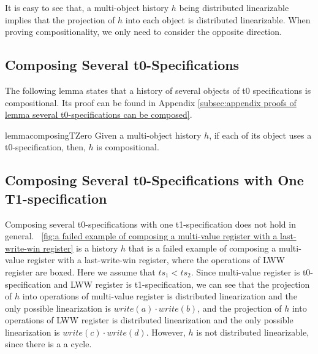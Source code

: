 It is easy to see that, a multi-object history $h$ being distributed linearizable implies that the projection of $h$ into each object is distributed linearizable. When proving compositionality, we only need to consider the opposite direction.




\subsection{Composing Several t0-Specifications}
\label{lemma:several t0-specifications can be composed}

The following lemma states that a history of several objects of t0 specifications is compositional. Its proof can be found in Appendix \ref{subsec:appendix proofs of lemma several t0-specifications can be composed}.

\begin{restatable}{lemma}{composingTZero}
\label{lemma:several t0-specifications can be composed}
Given a multi-object history $h$, if each of its object uses a t0-specification, then, $h$ is compositional.
\end{restatable} 




\subsection{Composing Several t0-Specifications with One T1-specification}
\label{lemma:composing several t0-specification with one t1-specification}

Composing several t0-specifications with one t1-specification does not hold in general. \figurename~\ref{fig:a failed example of composing a multi-value register with a last-write-win register} is a history $h$ that is a failed example of composing a multi-value register with a last-write-win register, where the operations of LWW register are boxed. Here we assume that $\mathit{ts}_1<\mathit{ts}_2$. Since multi-value register is t0-specification and LWW register is t1-specification, we can see that the projection of $h$ into operations of multi-value register is distributed linearization and the only possible linearization is $\mathit{write}(a) \cdot \mathit{write}(b)$, and the projection of $h$ into operations of LWW register is distributed linearization and the only possible linearization is $\mathit{write}(c) \cdot \mathit{write}(d)$. However, $h$ is not distributed linearizable, since there is a a cycle.


